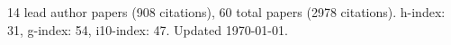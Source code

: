14 lead author papers (908 citations),
60 total papers (2978 citations).\newline
h-index: 31, g-index: 54, i10-index: 47. Updated \today.